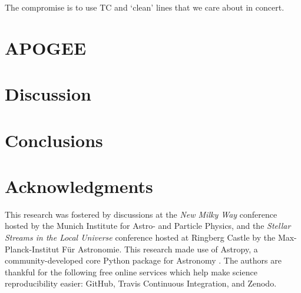 \documentclass[useAMS,usenatbib]{mn2e}
\begin{document}
The compromise is to use TC and `clean' lines that we care about in concert.








\section{APOGEE}





\section{Discussion}





\section{Conclusions}

% 


\section*{Acknowledgments}
This research was fostered by discussions at the \textit{New Milky Way}
conference hosted by the Munich Institute for Astro- and Particle Physics, and
the \textit{Stellar Streams in the Local Universe} conference hosted at Ringberg
Castle by the Max-Planck-Institut F\"ur Astronomie. This research made use of 
Astropy, a community-developed core Python package for Astronomy \citep{astropy}.
The authors are thankful for the following free online services which help make
science reproducibility easier: GitHub, Travis Continuous Integration, and Zenodo.
\end{document}
